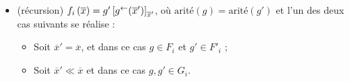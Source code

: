 \begin{definition}[$a$-LSRS]
\begin{itemize}[itemsep=-1mm]
					\item 	(récursion)		$f_i\left(\overline{x}\right) = g'\left[ g^{\leftarrow}(\overline{x}') \right]_{\overline{x}'}$, où $\text{arité}(g) = \text{arité}(g')$ et l'un des deux cas suivants se réalise :
							\begin{itemize}[itemsep=-1mm]
								\item 	Soit $\overline{x}' = \overline{x}$, et dans ce cas $g \in F_i$ et $g' \in F'_i$ ;
								\item 	Soit $\overline{x}' \ll \overline{x}$ et dans ce cas $g, g' \in G_i$. 
							\end{itemize}
%						
%						
				\end{itemize}
				
			\end{definition}
			
